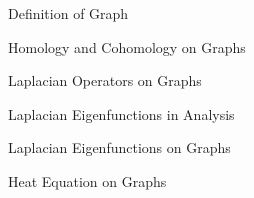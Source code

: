 \documentclass[../main.tex]{subfiles}
\begin{document}
    \begin{section}{Definition of Graph}
           
    \end{section}
    \begin{section}{Homology and Cohomology on Graphs}
        
    \end{section}
    \begin{section}{Laplacian Operators on Graphs}
        
    \end{section}
    \begin{section}{Laplacian Eigenfunctions in Analysis}
        
    \end{section}
    \begin{section}{Laplacian Eigenfunctions on Graphs}
        
    \end{section}
    \begin{section}{Heat Equation on Graphs}
        
    \end{section}
\end{document}

